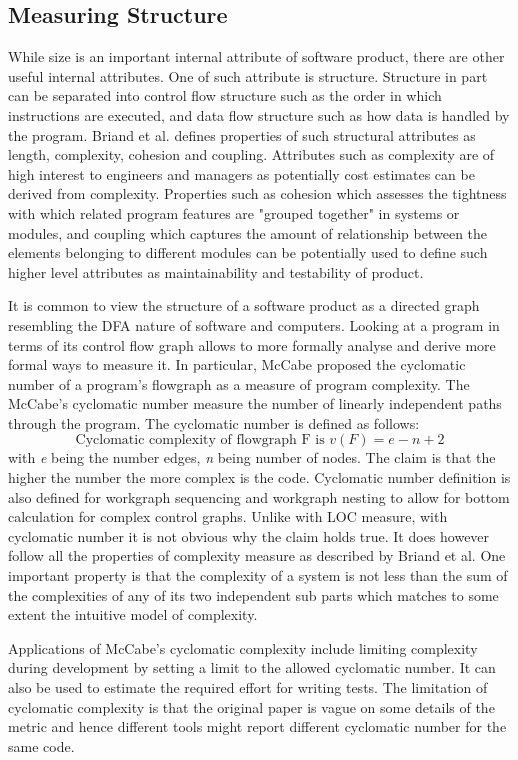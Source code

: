 \documentclass[11pt]{article}
\begin{document}
\subsection{Measuring Structure}
While size is an important internal attribute of software product, there are other useful internal attributes. One of such attribute is structure. Structure in part can be separated into control flow structure such as the order in which instructions are executed, and data flow structure such as how data is handled by the program.\cite{Fenton:2014:SMR:2700539} Briand et al.\cite{Briand:1996} defines properties of such structural attributes as length, complexity, cohesion and coupling. Attributes such as complexity are of high interest to engineers and managers as potentially cost estimates can be derived from complexity. Properties such as cohesion which assesses the tightness with which related program features are "grouped together" in systems or modules\cite{Briand:1996}, and coupling which captures the amount of relationship between the elements belonging to different modules\cite{Briand:1996} can be potentially used to define such higher level attributes as maintainability and testability of product.
\par 
It is common to view the structure of a software product as a directed graph resembling the DFA nature of software and computers. Looking at a program in terms of its control flow graph allows to more formally analyse and derive more formal ways to measure it. In particular, McCabe proposed the cyclomatic number of a program's flowgraph as a measure of program complexity. The McCabe's cyclomatic number measure the number of linearly independent paths through the program. The cyclomatic number is defined as follows:\[ \text{Cyclomatic complexity of flowgraph F is }v(F)=e-n+2\] with \textit{e} being the number edges, \textit{n} being number of nodes. The claim is that the higher the number the more complex is the code.  Cyclomatic number definition is also defined for workgraph sequencing and workgraph nesting to allow for bottom calculation for complex control graphs. Unlike with LOC measure, with cyclomatic number it is not obvious why the claim holds true. It does however follow all the properties of complexity measure as described by Briand et al.\cite{Briand:1996} One important property is that the complexity of a system is not less than the sum of the complexities of any of its two independent sub parts which matches to some extent the intuitive model of complexity.
\par 
Applications of McCabe's cyclomatic complexity include limiting complexity during development by setting a limit to the allowed cyclomatic number. It can also be used to estimate the required effort for writing tests.
The limitation of cyclomatic complexity is that the original paper is vague on some details of the metric and hence different tools might report different cyclomatic number for the same code. 
\end{document}
